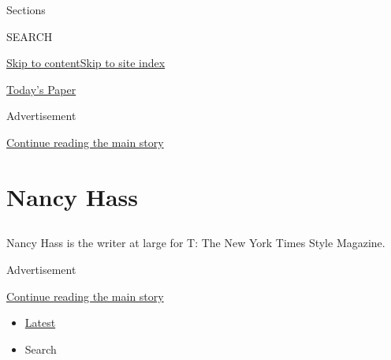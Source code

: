 Sections

SEARCH

\protect\hyperlink{site-content}{Skip to
content}\protect\hyperlink{site-index}{Skip to site index}

\href{https://myaccount.nytimes.com/auth/login?response_type=cookie\&client_id=vi}{}

\href{https://www.nytimes.com/section/todayspaper}{Today's Paper}

Advertisement

\protect\hyperlink{after-top}{Continue reading the main story}

\hypertarget{nancy-hass}{%
\section{Nancy Hass}\label{nancy-hass}}

\hypertarget{section}{%
\subsection{}\label{section}}

Nancy Hass is the writer at large for T: The New York Times Style
Magazine.

Advertisement

\protect\hyperlink{after-mid1}{Continue reading the main story}

\begin{itemize}
\tightlist
\item
  \protect\hyperlink{stream-panel}{Latest}
\item
  Search
\end{itemize}

